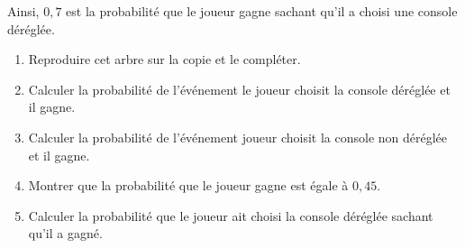 Ainsi, $0,7$ est la probabilité que le joueur gagne sachant qu'il a choisi une console déréglée.
\begin{enumerate}
     \item
     Reproduire cet arbre sur la copie et le compléter.
     \item
     Calculer la probabilité de l'événement \og le joueur choisit la console déréglée et il gagne\fg{}.
     \item
     Calculer la probabilité de l'événement \ogle joueur choisit la console non déréglée et il gagne\fg{}.
     \item
     Montrer que la probabilité que le joueur gagne est égale à $0,45$.
     \item
     Calculer la probabilité que le joueur ait choisi la console déréglée sachant qu'il a gagné.
\end{enumerate}
